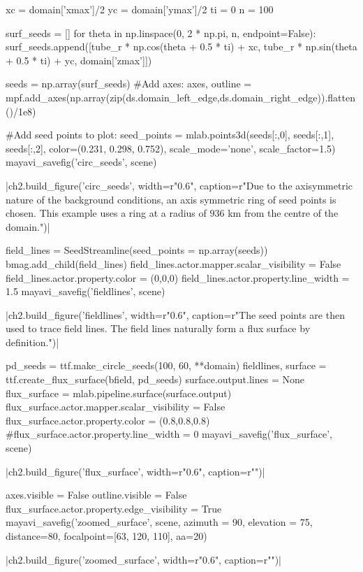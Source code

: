 \begin{pycode}[chapter2]
xc = domain['xmax']/2
yc = domain['ymax']/2
ti = 0
n = 100

surf_seeds = []
for theta in np.linspace(0, 2 * np.pi, n, endpoint=False):
    surf_seeds.append([tube_r * np.cos(theta + 0.5 * ti) + xc,
                  tube_r * np.sin(theta + 0.5 * ti) + yc, domain['zmax']])
                  
seeds = np.array(surf_seeds)
#Add axes:
axes, outline = mpf.add_axes(np.array(zip(ds.domain_left_edge,ds.domain_right_edge)).flatten()/1e8)

#Add seed points to plot:
seed_points = mlab.points3d(seeds[:,0], seeds[:,1], seeds[:,2],
                            color=(0.231, 0.298, 0.752), scale_mode='none',
                            scale_factor=1.5)
mayavi_savefig('circ_seeds', scene)
\end{pycode}
\py[chapter2]|ch2.build_figure('circ_seeds', width=r"0.6\columnwidth",
caption=r"Due to the axisymmetric nature of the background conditions, an axis symmetric ring of seed points is chosen. This example uses a ring at a radius of $936$ km from the centre of the domain.")|

\begin{pycode}[chapter2]
field_lines = SeedStreamline(seed_points = np.array(seeds))
bmag.add_child(field_lines)
field_lines.actor.mapper.scalar_visibility = False
field_lines.actor.property.color = (0,0,0)
field_lines.actor.property.line_width = 1.5
mayavi_savefig('fieldlines', scene)
\end{pycode}
\py[chapter2]|ch2.build_figure('fieldlines', width=r"0.6\columnwidth",
caption=r"The seed points are then used to trace field lines. The field lines naturally form a flux surface by definition.")|

\begin{pycode}[chapter2]
pd_seeds = ttf.make_circle_seeds(100, 60, **domain)
fieldlines, surface = ttf.create_flux_surface(bfield, pd_seeds)
surface.output.lines = None
flux_surface = mlab.pipeline.surface(surface.output)
flux_surface.actor.mapper.scalar_visibility = False
flux_surface.actor.property.color = (0.8,0.8,0.8)
#flux_surface.actor.property.line_width = 0
mayavi_savefig('flux_surface', scene)
\end{pycode}
\py[chapter2]|ch2.build_figure('flux_surface', width=r"0.6\columnwidth",
caption=r"")|

\begin{pycode}[chapter2]
axes.visible = False
outline.visible = False
flux_surface.actor.property.edge_visibility = True
mayavi_savefig('zoomed_surface', scene, azimuth = 90, elevation = 75, distance=80, focalpoint=[63, 120, 110], aa=20)
\end{pycode}
\py[chapter2]|ch2.build_figure('zoomed_surface', width=r"0.6\columnwidth",
caption=r"")|



